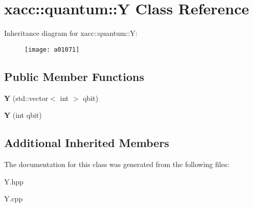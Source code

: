 \hypertarget{a01071}{}\section{xacc\+:\+:quantum\+:\+:Y Class Reference}
\label{a01071}
Inheritance diagram for xacc\+:\+:quantum\+:\+:Y\+:\begin{figure}[H]
\begin{center}
\leavevmode
\texttt{[image: a01071]}
\end{center}
\end{figure}
\subsection*{Public Member Functions}
\begin{DoxyCompactItemize}
\item 
\mbox{\label{a01071_a7959be0aa8221c0b1ba445771f5ecf0a}} 
{\bfseries Y} (std\+::vector$<$ int $>$ qbit)
\item 
\mbox{\label{a01071_aea2b37ac45208cbf6a47e0074e4a9653}} 
{\bfseries Y} (int qbit)
\end{DoxyCompactItemize}
\subsection*{Additional Inherited Members}


The documentation for this class was generated from the following files\+:\begin{DoxyCompactItemize}
\item 
Y.\+hpp\item 
Y.\+cpp\end{DoxyCompactItemize}
